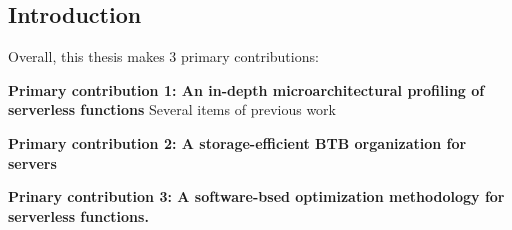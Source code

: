 \documentclass[../main.tex]{subfiles}
\begin{document}
\ifx\chapincluded\undefined
  \begin{refsection}
 \fi


\chapter{Introduction}



Overall, this thesis makes 3 primary contributions:

\vspace*{0.5cm}

\noindent
\textbf{Primary contribution 1: An in-depth microarchitectural profiling of serverless functions}
Several items of previous work 

\vspace*{0.5cm}

\noindent
\textbf{Primary contribution 2: A storage-efficient BTB organization for servers}

\vspace*{0.5cm}

\noindent
\textbf{Prinary contribution 3: A software-bsed optimization methodology for serverless functions.}

\ifx\chapincluded\undefined
  \printbibliography
  \end{refsection}
 \fi
\end{document}

